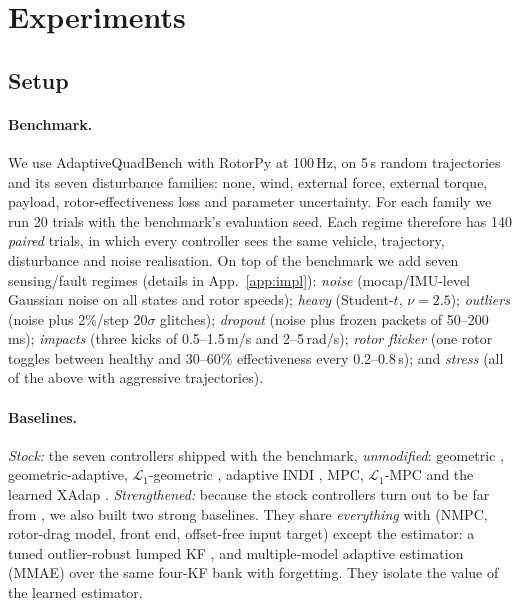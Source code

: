 \section{Experiments}
\label{sec:experiments}

\subsection{Setup}
\label{sec:exp-setup}
\paragraph{Benchmark.}
We use AdaptiveQuadBench \citep{zhang2025adaptivequadbench} with RotorPy \citep{folk2023rotorpy} at 100\,Hz, on 5\,s random trajectories and its seven disturbance families: none, wind, external force, external torque, payload, rotor-effectiveness loss and parameter uncertainty.
For each family we run 20 trials with the benchmark's evaluation seed. Each regime therefore has 140 \emph{paired} trials, in which every controller sees the same vehicle, trajectory, disturbance and noise realisation.
On top of the benchmark we add seven sensing/fault regimes (details in App.~\ref{app:impl}): \emph{noise} (mocap/IMU-level Gaussian noise on all states and rotor speeds); \emph{heavy} (Student-$t$, $\nu{=}2.5$); \emph{outliers} (noise plus 2\%/step 20$\sigma$ glitches); \emph{dropout} (noise plus frozen packets of 50--200\,ms); \emph{impacts} (three kicks of 0.5--1.5\,m/s and 2--5\,rad/s); \emph{rotor flicker} (one rotor toggles between healthy and 30--60\% effectiveness every 0.2--0.8\,s); and \emph{stress} (all of the above with aggressive trajectories).

\paragraph{Baselines.}
\emph{Stock:} the seven controllers shipped with the benchmark, \emph{unmodified}: geometric \citep{lee2010geometric}, geometric-adaptive, $\mathcal{L}_1$-geometric \citep{wu2023l1quad}, adaptive INDI \citep{smeur2016adaptive,tal2021accurate}, MPC, $\mathcal{L}_1$-MPC and the learned XAdap \citep{zhang2024xadap}.
\emph{Strengthened:} because the stock controllers turn out to be far from \ours{}, we also built two strong baselines. They share \emph{everything} with \ours{} (NMPC, rotor-drag model, front end, offset-free input target) except the estimator: a tuned outlier-robust lumped KF \citep{ting2007kalman}, and multiple-model adaptive estimation (MMAE) \citep{magill1965optimal} over the same four-KF bank with forgetting. They isolate the value of the learned estimator.

